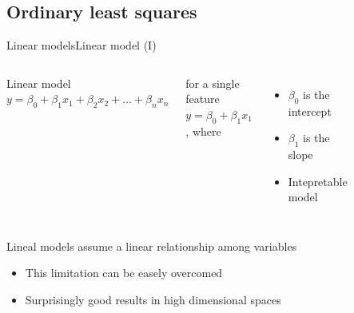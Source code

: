\documentclass[10pt,compress]{beamer} %
\begin{document}
\subsection{Ordinary least squares}
\begin{frame}{Linear models}{Linear model (I)}
    \begin{columns}
        \begin{block}{Linear model}
            $y = \beta_0 + \beta_1 x_1  + \beta_2 x_2 + \dots + \beta_n x_n$
        \end{block}
        
        for a single feature $y = \beta_0 + \beta_1 x_1$, where
        \begin{itemize}
            \item $\beta_0$ is the intercept
            \item $\beta_1$ is the slope
            \item Intepretable model
        \end{itemize}

		\begin{figure}
	        \includegraphics[width=\textwidth]{figs/regression.png}
		\end{figure}
    \end{columns}

    \bigskip

    Lineal models assume a linear relationship among variables
	\begin{itemize}
		\item This limitation can be easely overcomed
		\item Surprisingly good results in high dimensional spaces
	\end{itemize}
\end{frame}
\end{document}
